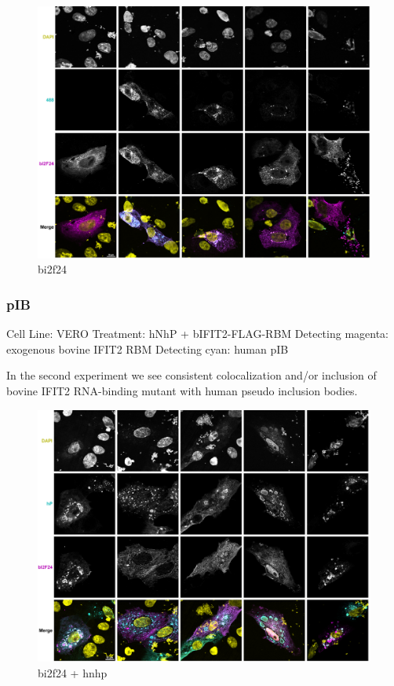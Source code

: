 \begin{figure}
    \centering
    \includegraphics[width=1\linewidth]{10. Chapter 5/Figs/05. IFIT2-RNA binding mutant/02. bi2f24.png}
    \caption[bi2f24]{bi2f24}
    \label{fig:bi2f24}
\end{figure}

\subsubsection{pIB}
Cell Line: VERO
Treatment: hNhP + bIFIT2-FLAG-RBM
Detecting magenta: exogenous bovine IFIT2 RBM
Detecting cyan: human pIB

In the second experiment we see consistent colocalization and/or inclusion of bovine IFIT2 RNA-binding mutant with human pseudo inclusion bodies.

\begin{figure}
    \centering
    \includegraphics[width=0.5\linewidth]{10. Chapter 5/Figs/05. IFIT2-RNA binding mutant/03. bi2f hnhp.png}
    \caption[bi2f24 + hnhp]{bi2f24 + hnhp}
    \label{fig:bi2f24 + hnhp}
\end{figure}

